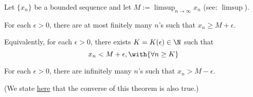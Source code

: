 \Theorem{}\label{d350704}

Let $\{x_n\}$ be a bounded sequence and let
$M:=\displaystyle\limsup_{n\to\infty}x_n$ (see: \href{f4f2af4}{$\limsup$}).

\begin{enumerati}
  \item For each $\epsilon>0$, there are at most finitely many $n$'s such that
        $x_n\geq M+\epsilon$.

  Equivalently, for each $\epsilon>0$, there exists $K=K(\epsilon)\in\N$ such
  that
  $$
    x_n<M+\epsilon,\with{\forall n\geq K}
  $$

  \item For each $\epsilon>0$, there are infinitely many $n$'s such that
        $x_n>M-\epsilon$.
\end{enumerati}

(We state \href{b4ab746}{here} that the converse of this theorem is also true.)

